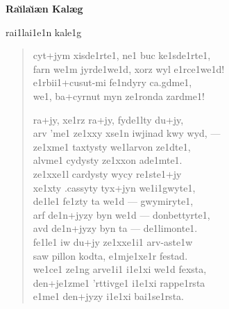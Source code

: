 \documentclass[12pt]{article}
\begin{document}
\begin{center}
{\LARGE\bf Ra\u\i la\u\i\ae n Kal\ae g


\bigskip\bigskip
\Huge\mxedc rai1lai1e1n kale1g
}
\end{center}

\bigskip
\begin{verse}

\begin{mxedr}
cyt+jym xisde1rte1, ne1 buc ke1sde1rte1,\\
farn we1m jyrde1we1d, xorz wyl e1rce1we1d!\\
e1rbii1+cusut-mi fe1ndyry ca.gdme1,\\
we1, ba+cyrnut myn ze1ronda zardme1!

\medskip
ra+jy, xe1rz ra+jy, fyde1lty du+jy,\\
arv 'me1 ze1xxy xse1n iwjinad kwy wyd, ---\\
ze1xme1 taxtysty we1larvon ze1dte1,\\
alvme1 cydysty ze1xxon ade1mte1.\\
ze1xxe1l cardysty wycy re1ste1+jy\\
xe1xty .cassyty tyx+jyn we1i1gwyte1,\\
de1le1 fe1zty ta we1d --- gwymiryte1,\\
arf de1n+jyzy byn we1d --- donbettyrte1,\\
avd de1n+jyzy byn ta --- de1limonte1.\\

fe1le1 iw du+jy ze1xxe1i1 arv-aste1w\\
saw pillon kodta, e1mje1xe1r festad.\\

we1ce1 ze1ng arve1i1 i1e1xi we1d fexsta,\\
den+je1zme1 'rttivge1 i1e1xi rappe1rsta\\
e1me1 den+jyzy i1e1xi bai1se1rsta.
\end{mxedr}
\end{verse}
\end{document}
